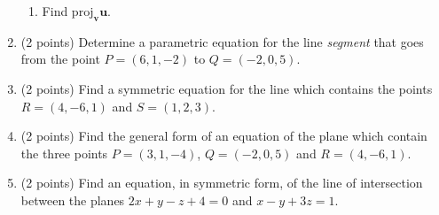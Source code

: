 \documentclass[11pt]{article}
\newcommand{\proj}{\text{proj}}
\begin{document}
\begin{enumerate}
\begin{enumerate}
              \item Find \(\proj_{\mathbf{v}}\mathbf{u}\).
          \end{enumerate}
    \item (2 points) Determine a parametric equation for the line \textit{segment} that goes from the point \(P = (6,1,-2)\) to \(Q = (-2, 0, 5)\).
    \item (2 points) Find a symmetric equation for the line which contains the points \(R = (4,-6,1)\) and \(S = (1,2,3)\).
    \item (2 points) Find the general form of an equation of the plane which contain the three points \(P = (3,1,-4)\), \(Q = (-2,0,5)\) and \(R = (4,-6,1)\).
    \item (2 points) Find an equation, in symmetric form, of the line of intersection between the planes \(2x + y - z + 4 = 0\) and \(x - y + 3z = 1\).
\end{enumerate}
\end{document}
